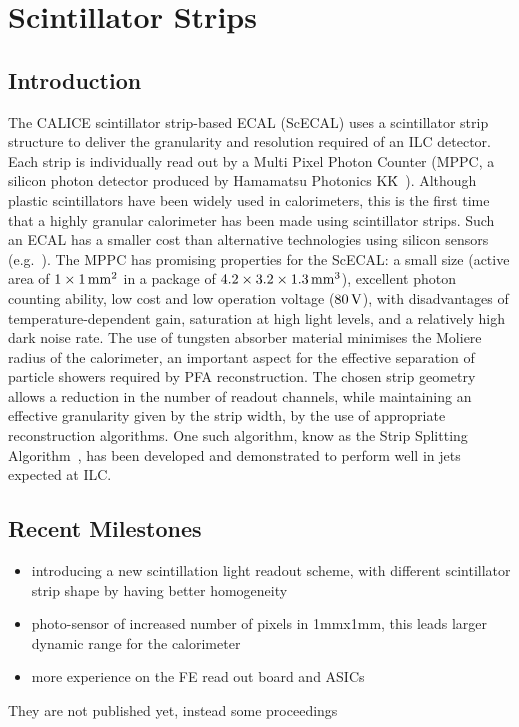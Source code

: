 \section{Scintillator Strips}
\subsection{Introduction}

The CALICE scintillator strip-based ECAL (ScECAL) uses a scintillator  strip
structure to deliver the granularity and resolution required of an ILC detector.
Each strip is individually read out by a Multi Pixel Photon Counter (MPPC, a
silicon photon detector produced by Hamamatsu Photonics K\.K\.~\cite{Gomi:2007zz}). Although
plastic scintillators have been widely used in calorimeters, this is the first
time that a highly granular calorimeter has been made using scintillator strips.
Such an ECAL has a smaller cost than alternative technologies using silicon
sensors (e.g.~\cite{1748-0221-3-08-P08001}). The MPPC has promising properties for the ScECAL: a small
size (active area of $\unit[1 \times 1]{mm^2}$ in a package of $\unit[4.2 \times 3.2 \times 1.3]{mm^3}$), excellent
photon counting ability, low cost and low operation voltage ($\unit[80]{V}$), with
disadvantages of temperature-dependent gain, saturation at high light levels,
and a relatively high dark noise rate. The use of tungsten absorber material
minimises the Moliere radius of the calorimeter, an important aspect for the
effective separation of particle showers required by PFA reconstruction. The
chosen strip geometry allows a reduction in the number of readout channels,
while maintaining an effective granularity given by the strip width, by the use
of appropriate reconstruction algorithms. One such algorithm, know as the Strip
Splitting Algorithm~\cite{Kotera2015}, has been developed and demonstrated to perform well in
jets expected at ILC.

\subsection{Recent Milestones}
\begin{itemize}
	\item introducing a new scintillation light readout scheme, with different scintillator strip shape by having better homogeneity
	\item photo-sensor of increased number of pixels in 1mmx1mm, this leads larger dynamic range for the calorimeter
	\item more experience on the FE read out board and ASICs
\end{itemize}
They are not published yet, instead some proceedings

